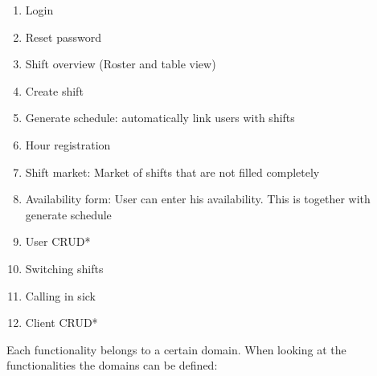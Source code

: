 \begin{enumerate}
    \item Login
    \item Reset password
    \item Shift overview (Roster and table view)
    \item Create shift
    \item Generate schedule: automatically link users with shifts
    \item Hour registration
    \item Shift market: Market of shifts that are not filled completely
    \item Availability form: User can enter his availability. This is together with generate schedule
    \item User CRUD*
    \item Switching shifts
    \item Calling in sick
    \item Client CRUD*
\end{enumerate}

Each functionality belongs to a certain domain. When looking at the functionalities the domains can be defined:


